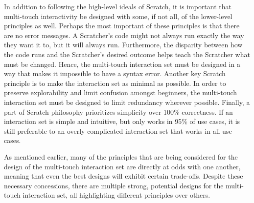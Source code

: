 In addition to following the high-level ideals of Scratch, it is important that multi-touch interactivity be designed with some, if not all, of the lower-level principles as well. Perhaps the most important of these principles is that there are no error messages. A Scratcher's code might not always run exactly the way they want it to, but it will always run. Furthermore, the disparity between how the code runs and the Scratcher's desired outcome helps teach the Scratcher what must be changed. Hence, the multi-touch interaction set must be designed in a way that makes it impossible to have a syntax error. Another key Scratch principle is to make the interaction set as minimal as possible. In order to preserve explorability and limit confusion amongst beginners, the multi-touch interaction set must be designed to limit redundancy wherever possible. Finally, a part of Scratch philosophy prioritizes simplicity over 100\% correctness. If an interaction set is simple and intuitive, but only works in 95\% of use cases, it is still preferable to an overly complicated interaction set that works in all use cases.

As mentioned earlier, many of the principles that are being considered for the design of the multi-touch interaction set are directly at odds with one another, meaning that even the best designs will exhibit certain trade-offs. Despite these necessary concessions, there are multiple strong, potential designs for the multi-touch interaction set, all highlighting different principles over others.
